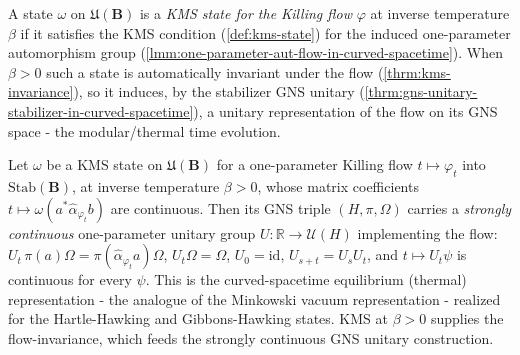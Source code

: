 \begin{definition}
    \label{def:kms-state-for-flow-in-curved-spacetime}
    \leanok
    A state $\omega$ on $\mathfrak{U}(\mathbf{B})$ is a \emph{KMS state for the Killing flow} $\varphi$ at inverse temperature $\beta$ if it satisfies the KMS condition (\ref{def:kms-state}) for the induced one-parameter automorphism group (\ref{lmm:one-parameter-aut-flow-in-curved-spacetime}). When $\beta > 0$ such a state is automatically invariant under the flow (\ref{thrm:kms-invariance}), so it induces, by the stabilizer GNS unitary (\ref{thrm:gns-unitary-stabilizer-in-curved-spacetime}), a unitary representation of the flow on its GNS space - the modular/thermal time evolution.
\end{definition}

\begin{theorem}
    \label{thrm:kms-thermal-representation-in-curved-spacetime}
    \leanok
    Let $\omega$ be a KMS state on $\mathfrak{U}(\mathbf{B})$ for a one-parameter Killing flow $t \mapsto \varphi_t$ into $\mathrm{Stab}(\mathbf{B})$, at inverse temperature $\beta > 0$, whose matrix coefficients $t \mapsto \omega(a^* \hat\alpha_{\varphi_t} b)$ are continuous. Then its GNS triple $(H, \pi, \Omega)$ carries a \emph{strongly continuous} one-parameter unitary group $U : \mathbb{R} \to \mathcal{U}(H)$ implementing the flow: $U_t\,\pi(a)\Omega = \pi(\hat\alpha_{\varphi_t} a)\Omega$, $U_t\Omega = \Omega$, $U_0 = \mathrm{id}$, $U_{s+t} = U_s U_t$, and $t \mapsto U_t\psi$ is continuous for every $\psi$. This is the curved-spacetime equilibrium (thermal) representation - the analogue of the Minkowski vacuum representation - realized for the Hartle-Hawking and Gibbons-Hawking states. KMS at $\beta > 0$ supplies the flow-invariance, which feeds the strongly continuous GNS unitary construction.
\end{theorem}
